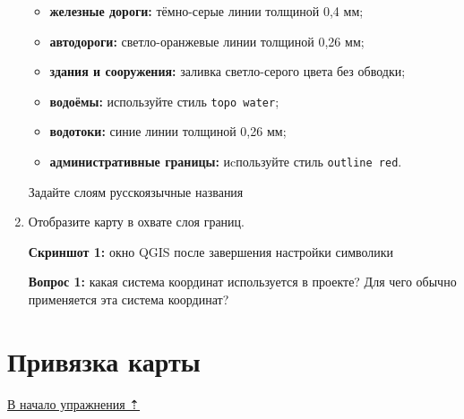 \documentclass[
  12pt,
]{book}
\providecommand{\tightlist}{%
  \setlength{\itemsep}{0pt}\setlength{\parskip}{0pt}}
\begin{document}
\begin{enumerate}
  \begin{itemize}
  \tightlist
  \item
    \textbf{железные дороги:} тёмно-серые линии толщиной 0,4 мм;
  \item
    \textbf{автодороги:} светло-оранжевые линии толщиной 0,26 мм;
  \item
    \textbf{здания и сооружения:} заливка светло-серого цвета без обводки;
  \item
    \textbf{водоёмы:} используйте стиль \texttt{topo\ water};
  \item
    \textbf{водотоки:} синие линии толщиной 0,26 мм;
  \item
    \textbf{административные границы:} иcпользуйте стиль \texttt{outline\ red}.
  \end{itemize}

  Задайте слоям русскоязычные названия
\item
  Отобразите карту в охвате слоя границ.

  \textbf{Скриншот 1:} окно QGIS после завершения настройки символики

  \textbf{Вопрос 1:} какая система координат используется в проекте? Для чего обычно применяется эта система координат?
\end{enumerate}

\hypertarget{map-ref-districts-referencing}{%
\section{Привязка карты}\label{map-ref-districts-referencing}}

\protect\hyperlink{map-ref-districts}{В начало упражнения ⇡}
\end{document}
